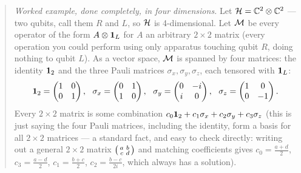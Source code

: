 \begin{quote}
\textit{Worked example, done completely, in four dimensions.} Let $\mathcal{H}=\mathbb C^2\otimes\mathbb C^2$ — two
qubits, call them $R$ and $L$, so $\mathcal{H}$ is 4-dimensional. Let $\mathcal{M}$ be every operator of the form $A\otimes
\mathbf{1}_L$ for $A$ an arbitrary $2\times2$ matrix (every operation you could perform using only apparatus touching
qubit $R$, doing nothing to qubit $L$). As a vector space, $\mathcal{M}$ is spanned by four matrices: the identity
$\mathbf{1}_2$ and the three Pauli matrices $\sigma_x,\sigma_y,\sigma_z$, each tensored with $\mathbf{1}_L$:
\[
\id_2=\begin{pmatrix}1&0\\0&1\end{pmatrix},\ \
\sigma_x=\begin{pmatrix}0&1\\1&0\end{pmatrix},\ \
\sigma_y=\begin{pmatrix}0&-i\\i&0\end{pmatrix},\ \
\sigma_z=\begin{pmatrix}1&0\\0&-1\end{pmatrix}.
\]
Every $2\times2$ matrix is some combination $c_0\mathbf{1}_2+c_1\sigma_x+c_2\sigma_y+c_3\sigma_z$ (this is just
saying the four Pauli matrices, including the identity, form a basis for all $2\times2$ matrices — a standard
fact, and easy to check directly: writing out a general $2\times2$ matrix $\begin{psmallmatrix}a&b\\c&d
\end{psmallmatrix}$ and matching coefficients gives $c_0=\tfrac{a+d}2$, $c_3=\tfrac{a-d}2$,
$c_1=\tfrac{b+c}2$, $c_2=\tfrac{b-c}{2i}$, which always has a solution).


\end{quote}
